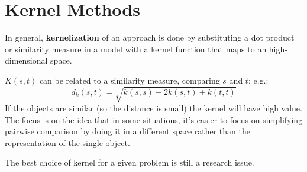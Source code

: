 \section{Kernel Methods}

In general, \textbf{kernelization} of an approach is done by substituting a dot product or similarity measure in a model with a kernel function that maps to an high-dimensional space.

$K(s,t)$ can be related to a similarity measure, comparing $s$ and $t$; e.g.:
\begin{equation*}
    d_k(s,t) = \sqrt{k(s,s) - 2k(s,t) + k(t,t)}
\end{equation*}
If the objects are similar (so the distance is small) the kernel will have high value. The focus is on the idea that in some situations, it's easier to focus on simplifying pairwise comparison by doing it in a different space rather than the representation of the single object.

The best choice of kernel for a given problem is still a research issue.